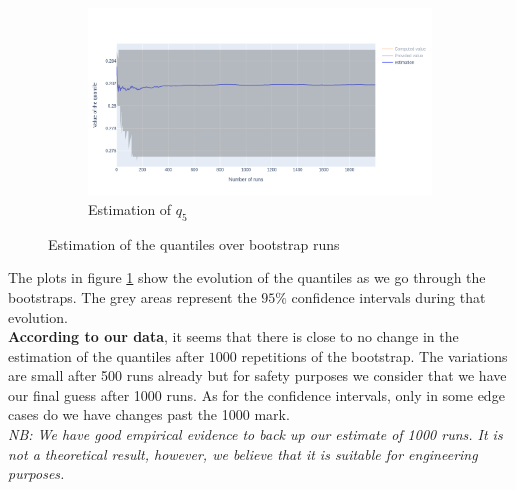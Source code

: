 \documentclass{article}
\begin{document}
\begin{figure}
\begin{subfigure}{.8 \textwidth}
    \end{subfigure}
    \hfill
    \begin{subfigure}{.8 \textwidth}
        \includegraphics[width=\textwidth]{images/estimation_q5.png}
        \caption{Estimation of $q_5$}
    \end{subfigure}
    \caption{Estimation of the quantiles over bootstrap runs}
    \label{fig: estimation of quantiles}
\end{figure}

The plots in figure \ref{fig: estimation of quantiles} show the evolution of the quantiles as we go through the bootstraps. The grey areas represent the $95\%$ confidence intervals during that evolution.\\
\textbf{According to our data}, it seems that there is close to no change in the estimation of the quantiles after $1000$ repetitions of the bootstrap. The variations are small after 500 runs already but for safety purposes we consider that we have our final guess after 1000 runs. As for the confidence intervals, only in some edge cases do we have changes past the 1000 mark. \\
\textit{NB: We have good empirical evidence to back up our estimate of 1000 runs. It is not a theoretical result, however, we believe that it is suitable for engineering purposes.}
\end{document}
